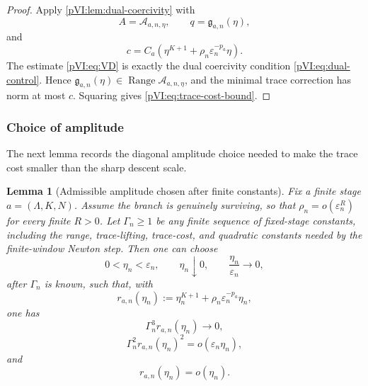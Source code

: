 \documentclass[11pt]{article}
\numberwithin{equation}{section}
\theoremstyle{plain}
\newtheorem{lemma}{Lemma}[section]
\theoremstyle{definition}
\theoremstyle{remark}
\DeclareMathOperator{\Range}{Range}
\newcommand{\eps}{\varepsilon}
\newcommand{\calA}{\mathcal A}
\begin{document}
\begin{proof}
Apply \cref{pVI:lem:dual-coercivity} with
\[
        A=\calA_{a,n,\eta},
        \qquad
        q=\mathfrak g_{a,n}(\eta),
\]
and
\[
        c=
        C_a
        \left(
        \eta^{K+1}
        +
        \rho_n\eps_n^{-p_a}\eta
        \right).
\]
The estimate \eqref{pVI:eq:VD} is exactly the dual coercivity condition \eqref{pVI:eq:dual-control}.  Hence
\(\mathfrak g_{a,n}(\eta)\in\Range\calA_{a,n,\eta}\), and the minimal trace correction has norm at
most \(c\).  Squaring gives \eqref{pVI:eq:trace-cost-bound}.
\end{proof}

\subsubsection{Choice of amplitude}

The next lemma records the diagonal amplitude choice needed to make the trace cost smaller than
the sharp descent scale.

\begin{lemma}[Admissible amplitude chosen after finite constants]\label{pVI:lem:amplitude-choice}
Fix a finite stage \(a=(\Lambda,K,N)\).  Assume the branch is genuinely surviving, so that
\(\rho_n=o(\eps_n^R)\) for every finite \(R>0\).  Let \(\Gamma_n\ge1\) be any finite sequence of fixed-stage constants, including the range, trace-lifting, trace-cost, and quadratic constants needed by the finite-window Newton step.  Then one can choose
\[
        0<\eta_n<\eps_n,
        \qquad
        \eta_n\downarrow0,
        \qquad
        \frac{\eta_n}{\eps_n}\to0,
\]
after \(\Gamma_n\) is known, such that, with
\[
        r_{a,n}(\eta_n)
        :=
        \eta_n^{K+1}+\rho_n\eps_n^{-p_a}\eta_n,
\]
one has
\begin{equation}\label{pVI:eq:newton-small-after-constants}
        \Gamma_n^3 r_{a,n}(\eta_n)\to0,
\end{equation}
\begin{equation}\label{pVI:eq:trace-cost-small}
        \Gamma_n^2 r_{a,n}(\eta_n)^2=o(\eps_n\eta_n),
\end{equation}
and
\begin{equation}\label{pVI:eq:residual-lower-than-amplitude}
        r_{a,n}(\eta_n)=o(\eta_n).
\end{equation}
\end{lemma}
\end{document}
